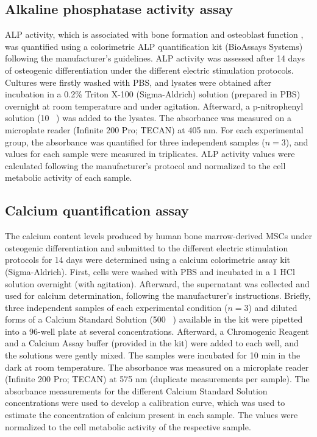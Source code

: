 \subsection{Alkaline phosphatase activity assay} 
\acs{ALP} activity, which is associated with bone formation and osteoblast function \cite{Nakamura2020-zx}, was quantified using a colorimetric \ac{ALP} quantification kit (BioAssays Systems) following the manufacturer’s guidelines. \ac{ALP} activity was assessed after 14 days of osteogenic differentiation under the different electric stimulation protocols. Cultures were firstly washed with \ac{PBS}, and lysates were obtained after incubation in a 0.2\si{\percent} Triton X-100 (Sigma-Aldrich) solution (prepared in \ac{PBS}) overnight at room temperature and under agitation. Afterward, a p-nitrophenyl solution (10 \si{\milli\molar}) was added to the lysates. The absorbance was measured on a microplate reader (Infinite 200 Pro; TECAN) at 405 \si{\nano\meter}. For each experimental group, the absorbance was quantified for three independent samples ($n=3$), and values for each sample were measured in triplicates. \ac{ALP} activity values were calculated following the manufacturer’s protocol and normalized to the cell metabolic activity of each sample.  

\subsection{Calcium quantification assay} 
The calcium content levels produced by human bone marrow-derived \ac{MSCs} under osteogenic differentiation and submitted to the different electric stimulation protocols for 14 days were determined using a calcium colorimetric assay kit (Sigma-Aldrich). First, cells were washed with \ac{PBS} and incubated in a 1\si{\molar} HCl solution overnight (with agitation). Afterward, the supernatant was collected and used for calcium determination, following the manufacturer’s instructions. Briefly, three independent samples of each experimental condition ($n=3$) and diluted forms of a Calcium Standard Solution (500 \si{\milli\molar}) available in the kit were pipetted into a 96-well plate at several concentrations. Afterward, a Chromogenic Reagent and a Calcium Assay buffer (provided in the kit) were added to each well, and the solutions were gently mixed. The samples were incubated for 10 min in the dark at room temperature. The absorbance was measured on a microplate reader (Infinite 200 Pro; TECAN) at 575 \si{\nano\meter} (duplicate measurements per sample). The absorbance measurements for the different Calcium Standard Solution concentrations were used to develop a calibration curve, which was used to estimate the concentration of calcium present in each sample. The values were normalized to the cell metabolic activity of the respective sample.

